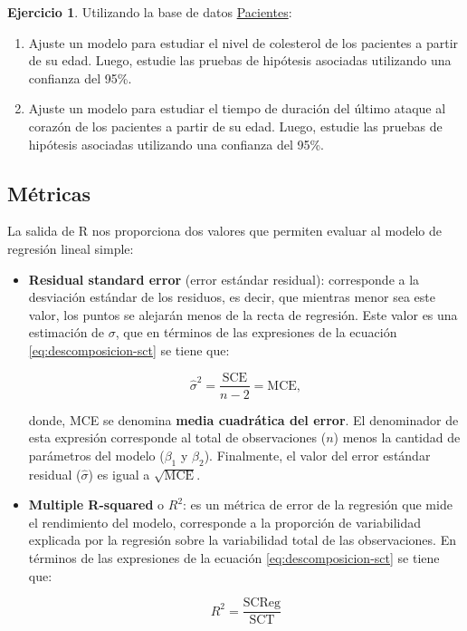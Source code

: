 \documentclass[
  11pt,
]{book}
\providecommand{\tightlist}{%
  \setlength{\itemsep}{0pt}\setlength{\parskip}{0pt}}
\theoremstyle{definition}
\theoremstyle{definition}
\theoremstyle{definition}
\newtheorem{exercise}{Ejercicio}[chapter]
\theoremstyle{definition}
\theoremstyle{remark}
\begin{document}
\begin{exercise}

Utilizando la base de datos \hyperref[Pacientes]{Pacientes}:

\begin{enumerate}
\def\labelenumi{\arabic{enumi}.}
\tightlist
\item
  Ajuste un modelo para estudiar el nivel de colesterol de los pacientes a partir de su edad. Luego, estudie las pruebas de hipótesis asociadas utilizando una confianza del 95\%.
\item
  Ajuste un modelo para estudiar el tiempo de duración del último ataque al corazón de los pacientes a partir de su edad. Luego, estudie las pruebas de hipótesis asociadas utilizando una confianza del 95\%.
\end{enumerate}

\end{exercise}

\subsection{Métricas}\label{metricasRLS}

La salida de R nos proporciona dos valores que permiten evaluar al modelo de regresión lineal simple:

\begin{itemize}
\item
  \textbf{Residual standard error} (error estándar residual): corresponde a la desviación estándar de los residuos, es decir, que mientras menor sea este valor, los puntos se alejarán menos de la recta de regresión. Este valor es una estimación de \(\sigma\), que en términos de las expresiones de la ecuación \eqref{eq:descomposicion-sct} se tiene que:

  \begin{equation}
  \widehat{\sigma}^2 = \frac{\text{SCE}}{n-2} = \text{MCE},
  \label{eq:sigma2-estimador}
  \end{equation}

  donde, MCE se denomina \textbf{media cuadrática del error}. El denominador de esta expresión corresponde al total de observaciones (\(n\)) menos la cantidad de parámetros del modelo (\(\beta_1\) y \(\beta_2\)). Finalmente, el valor del error estándar residual (\(\widehat{\sigma}\)) es igual a \(\sqrt{\text{MCE}}\).
\item
  \textbf{Multiple R-squared} o \(R^2\): es un métrica de error de la regresión que mide el rendimiento del modelo, corresponde a la proporción de variabilidad explicada por la regresión sobre la variabilidad total de las observaciones. En términos de las expresiones de la ecuación \eqref{eq:descomposicion-sct} se tiene que:

  \begin{equation}
  R^2 = \frac{\text{SCReg}}{\text{SCT}}
  \label{eq:R2-RLS}
  \end{equation}
\end{itemize}
\end{document}
